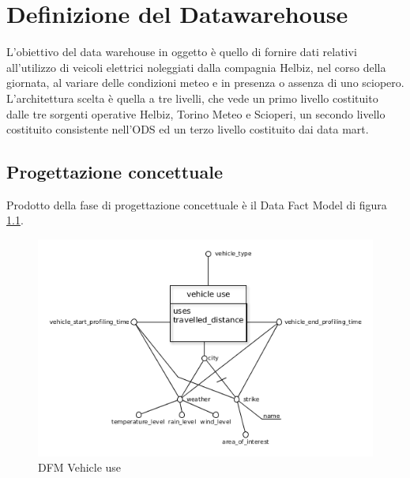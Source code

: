 \chapter{Definizione del Datawarehouse}

L'obiettivo del data warehouse in oggetto è quello di fornire dati relativi
all'utilizzo di veicoli elettrici noleggiati dalla compagnia Helbiz, nel corso
della giornata, al variare delle condizioni meteo e in presenza o assenza di uno
sciopero.
L'architettura scelta è quella a tre livelli, che vede un primo livello costituito
dalle tre sorgenti operative Helbiz, Torino Meteo e Scioperi, un secondo livello
costituito consistente nell'ODS ed un terzo livello costituito dai data mart.

\section{Progettazione concettuale}

Prodotto della fase di progettazione concettuale è il Data Fact Model di figura
\ref{fig:dfm}.

\begin{figure}[H]                                                                                                                                                            
\centering                                                                                                                                                                   
\includegraphics[width=\textwidth]{diagrams/dfm}                                                                                                                                   
\caption{DFM Vehicle use}                                                                                                                                            
\label{fig:dfm}                                                                                                                                                           
\end{figure}

